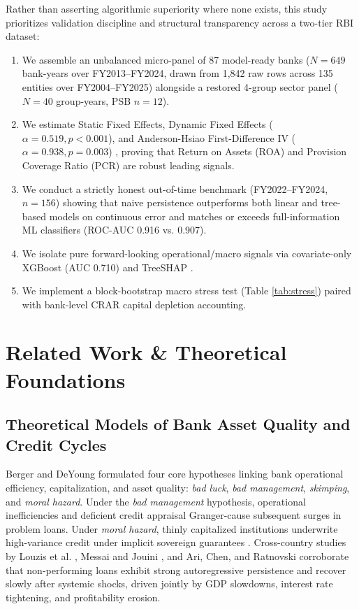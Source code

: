 \documentclass[conference]{IEEEtran}
\begin{document}
Rather than asserting algorithmic superiority where none exists, this study prioritizes validation discipline and structural transparency across a two-tier RBI dataset:
\begin{enumerate}
    \item We assemble an unbalanced micro-panel of 87 model-ready banks ($N = 649$ bank-years over FY2013--FY2024, drawn from 1,842 raw rows across 135 entities over FY2004--FY2025) alongside a restored 4-group sector panel ($N = 40$ group-years, PSB $n = 12$).
    \item We estimate Static Fixed Effects, Dynamic Fixed Effects ($\alpha = 0.519, p < 0.001$), and Anderson-Hsiao First-Difference IV ($\alpha = 0.938, p = 0.003$) \cite{arellano1991}, proving that Return on Assets (ROA) and Provision Coverage Ratio (PCR) are robust leading signals.
    \item We conduct a strictly honest out-of-time benchmark (FY2022--FY2024, $n = 156$) showing that naive persistence outperforms both linear and tree-based models on continuous error and matches or exceeds full-information ML classifiers (ROC-AUC 0.916 vs. 0.907).
    \item We isolate pure forward-looking operational/macro signals via covariate-only XGBoost (AUC 0.710) and TreeSHAP \cite{lundberg2017, lundberg2020}.
    \item We implement a block-bootstrap macro stress test (Table \ref{tab:stress}) paired with bank-level CRAR capital depletion accounting.
\end{enumerate}

\section{Related Work \& Theoretical Foundations}
\subsection{Theoretical Models of Bank Asset Quality and Credit Cycles}
Berger and DeYoung \cite{berger1997} formulated four core hypotheses linking bank operational efficiency, capitalization, and asset quality: \emph{bad luck}, \emph{bad management}, \emph{skimping}, and \emph{moral hazard}. Under the \emph{bad management} hypothesis, operational inefficiencies and deficient credit appraisal Granger-cause subsequent surges in problem loans. Under \emph{moral hazard}, thinly capitalized institutions underwrite high-variance credit under implicit sovereign guarantees \cite{acharya2020, berger1997}. Cross-country studies by Louzis et al. \cite{louzis2012}, Messai and Jouini \cite{messai2013}, and Ari, Chen, and Ratnovski \cite{ari2020} corroborate that non-performing loans exhibit strong autoregressive persistence and recover slowly after systemic shocks, driven jointly by GDP slowdowns, interest rate tightening, and profitability erosion.
\end{document}
